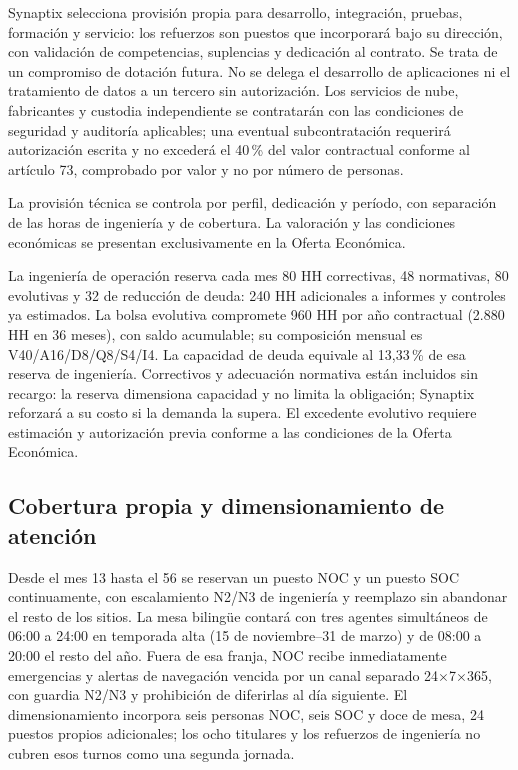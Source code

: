 Synaptix selecciona provisión propia para desarrollo, integración, pruebas, formación y servicio: los refuerzos son puestos que incorporará bajo su dirección, con validación de competencias, suplencias y dedicación al contrato. Se trata de un compromiso de dotación futura. No se delega el desarrollo de aplicaciones ni el tratamiento de datos a un tercero sin autorización. Los servicios de nube, fabricantes y custodia independiente se contratarán con las condiciones de seguridad y auditoría aplicables; una eventual subcontratación requerirá autorización escrita y no excederá el 40\,\% del valor contractual conforme al artículo 73, comprobado por valor y no por número de personas.

La provisión técnica se controla por perfil, dedicación y período, con separación de las horas de ingeniería y de cobertura. La valoración y las condiciones económicas se presentan exclusivamente en la Oferta Económica.

La ingeniería de operación reserva cada mes 80 HH correctivas, 48 normativas, 80 evolutivas y 32 de reducción de deuda: 240 HH adicionales a informes y controles ya estimados. La bolsa evolutiva compromete 960 HH por año contractual (2.880 HH en 36 meses), con saldo acumulable; su composición mensual es V40/A16/D8/Q8/S4/I4. La capacidad de deuda equivale al 13,33\,\% de esa reserva de ingeniería. Correctivos y adecuación normativa están incluidos sin recargo: la reserva dimensiona capacidad y no limita la obligación; Synaptix reforzará a su costo si la demanda la supera. El excedente evolutivo requiere estimación y autorización previa conforme a las condiciones de la Oferta Económica.~\parencite[RT-21.19--22; pp.~35--38]{bases-transversales}~\parencite[art.~73; Formulario E-26; pp.~38--76]{bases-admin}




\subsection{Cobertura propia y dimensionamiento de atención} %
Desde el mes 13 hasta el 56 se reservan un puesto NOC y un puesto SOC continuamente, con escalamiento N2/N3 de ingeniería y reemplazo sin abandonar el resto de los sitios. La mesa bilingüe contará con tres agentes simultáneos de 06:00 a 24:00 en temporada alta (15 de noviembre--31 de marzo) y de 08:00 a 20:00 el resto del año. Fuera de esa franja, NOC recibe inmediatamente emergencias y alertas de navegación vencida por un canal separado 24$\times$7$\times$365, con guardia N2/N3 y prohibición de diferirlas al día siguiente. El dimensionamiento incorpora seis personas NOC, seis SOC y doce de mesa, 24 puestos propios adicionales; los ocho titulares y los refuerzos de ingeniería no cubren esos turnos como una segunda jornada.

